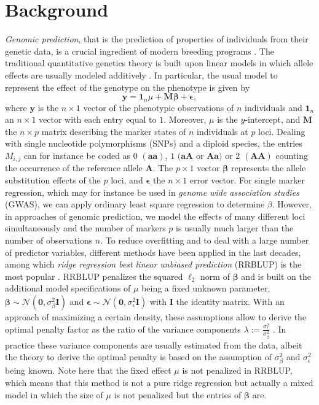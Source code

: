 \documentclass{bmcart}
\newcommand{\M}{\mathbf{M}}
\newcommand{\0}{\mathbf{0}}
\begin{document}
\section*{Background}
\emph{Genomic prediction}, that is the prediction of properties of individuals from their genetic data, is a crucial ingredient of modern breeding programs \cite{meuwissen01,schaeffer06,habier07,hayes09a,hayes13}.
The traditional quantitative genetics theory is built upon linear models in which allele effects are usually modeled additively \cite{falconer96}.
In particular,
the usual model to represent the effect of the genotype on the phenotype is given by
\begin{equation} \label{eq:01}
	\mathbf{y}=\mathbf{1}_n \mu + \M \bm{\beta} + \bm{\epsilon},
\end{equation} 
where $\mathbf{y}$ is the $n \times 1$ vector of the phenotypic observations of $n$ individuals and $\mathbf{1}_n$ an $n \times 1$ vector with each entry equal to $1$.  Moreover,
$\mu$ is the $y$-intercept, and $\M$  the  $n \times p$ matrix describing the marker states of $n$ individuals at $p$ loci. Dealing with single nucleotide polymorphisms (SNPs) and a diploid species, the entries $M_{i,j}$ can for instance be coded as $0$ $(\mathbf{aa})$, $1$ $(\mathbf{aA}$ or $\mathbf{Aa})$ or $2$ $(\mathbf{AA})$ counting the occurrence of the reference allele $\mathbf{A}$. The $p \times 1$ vector $\bm{\beta}$ represents the allele substitution effects of the $p$ loci, and $\bm{\epsilon}$ the $n \times 1$ error vector. For single marker regression, which may for instance be used in \emph{genome wide association studies} (GWAS), we can apply ordinary least square regression to determine $\beta$. 
However, in approaches of genomic prediction, we model the effects of many different loci simultaneously and the number of markers $p$ is usually much larger than the number of observations $n$. To reduce overfitting and to deal with a large number of predictor variables, different methods have been applied in the last decades, among which \emph{ridge regression best linear unbiased prediction} (RRBLUP) is the most popular \cite{schaeffer2004application}. RRBLUP penalizes the squared $\ell_2$ norm of $\bm{\beta}$ and is built on the additional model specifications of $\mu$ being a fixed unknown parameter, $\bm{\beta}\sim \mathcal{N}(\bm{0},\sigma_\beta^2 \mathbf{I})$ and $\bm{\epsilon}\sim \mathcal{N}(\bm{0},\sigma_\epsilon^2 \mathbf{I})$ with $\mathbf{I}$ the identity matrix.
With an approach of maximizing a certain density, these assumptions allow to derive the optimal penalty factor as the ratio of the variance components $\lambda:= \frac{\sigma_\epsilon^2}{\sigma_\beta^2}$ \cite{henderson75,henderson76,henderson77}. In practice these variance components are usually estimated from the data, albeit the theory to derive the optimal penalty is based on the assumption of $\sigma_\beta^2$ and $\sigma_\epsilon^2$ being known. Note here that the fixed effect $\mu$ is not penalized in RRBLUP, which means that this method is not a pure ridge regression but actually a mixed model in which the size of $\mu$ is not penalized but the entries of $\bm{\beta}$ are.  
\end{document}
